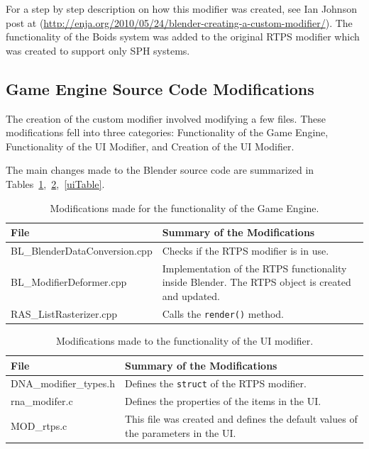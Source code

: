 For a step by step description on how this modifier was created, see Ian Johnson post at (\url{http://enja.org/2010/05/24/blender-creating-a-custom-modifier/}).  The functionality of the Boids system was added to the original RTPS modifier which was created to support only SPH systems. 

\subsection{Game Engine Source Code Modifications}
The creation of the custom modifier involved modifying a few files. These modifications fell into three categories: Functionality of the Game Engine, Functionality of the UI Modifier, and  Creation of the UI Modifier.

The main changes made to the Blender source code are summarized in Tables~\ref{geTable},~\ref{funcTable},~\ref{uiTable}.


\begin{table}[htdp]
\caption{Modifications made for the functionality of the Game Engine.}
\begin{center}
\begin{tabular}{|p{6cm}|p{6cm}|}
\hline 
\textbf{File} & \textbf{Summary of the Modifications} \\\hline 
BL\_BlenderDataConversion.cpp & Checks if the RTPS modifier is in use. \\\hline 
BL\_ModifierDeformer.cpp & Implementation of the RTPS functionality inside Blender. The RTPS object is created and updated. \\\hline 
RAS\_ListRasterizer.cpp & Calls the \texttt{render()} method. \\
\hline 
\end{tabular} 
\end{center}
\label{geTable}
\end{table}

\begin{table}[htdp]
\caption{Modifications made to the functionality of the UI modifier.}
\begin{center}
\begin{tabular}{|p{6cm}|p{6cm}|}
\hline 
\textbf{File} & \textbf{Summary of the Modifications} \\\hline 
DNA\_modifier\_types.h & Defines the \texttt{struct} of the RTPS modifier. \\\hline 
rna\_modifer.c & Defines the properties of the items in the UI. \\\hline 
MOD\_rtps.c & This file was created and defines the default values of the parameters in the UI. \\
\hline 
\end{tabular}
\end{center}
\label{funcTable}
\end{table}

